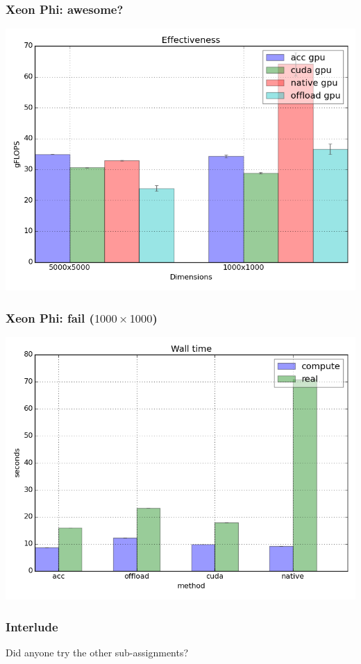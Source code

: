 \documentclass{beamer}
\begin{document}
\begin{frame}
 \frametitle{Xeon Phi: awesome?}
 \includegraphics[width=\textwidth]{bonus_effectivness.png}
\end{frame}

\begin{frame}
 \frametitle{Xeon Phi: fail ($1000 \times 1000$)}
 \includegraphics[width=\textwidth]{bonus_realvscompute.png}
\end{frame}

\begin{frame}
 \frametitle{Interlude}
 Did anyone try the other sub-assignments?
\end{frame}
\end{document}
